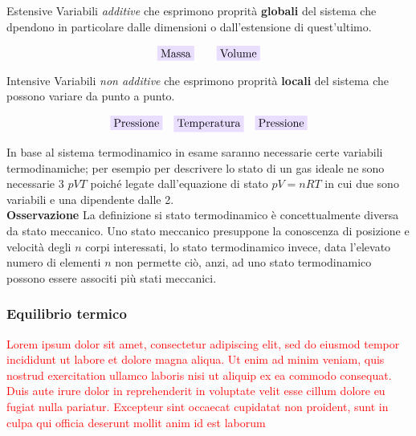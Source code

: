 \documentclass[x11names]{article}
\newcommand{\viola}[1]{\colorbox{yred}{$\displaystyle #1$}}
\begin{document}
\begin{center}
\begin{minipage}{0.49\textwidth}
	\begin{es}{Estensive}
		Variabili \textit{additive} che esprimono proprità \textbf{globali} del sistema che dpendono in particolare dalle dimensioni o dall'estensione di quest'ultimo.
		
		\[\viola{\text{Massa}} \qquad \viola{\text{Volume}}\]
		
	\end{es}
\end{minipage}
\begin{minipage}{0.49\textwidth}
	\begin{es}{Intensive}
	Variabili \textit{non additive} che esprimono proprità \textbf{locali} del sistema che possono variare da punto a punto.
	
	\[\viola{\text{Pressione}} \quad \viola{\text{Temperatura}}\quad \viola{\text{Pressione}}\]
	
	\end{es}
\end{minipage}
\end{center}
In base al sistema termodinamico in esame saranno necessarie certe variabili termodinamiche; per esempio per descrivere lo stato di un gas ideale ne sono necessarie 3 \(pVT\) poiché legate dall'equazione di stato \( pV = nRT\) in cui due sono variabili e una dipendente dalle 2.\\

\noindent
\textbf{Osservazione}  La definizione si stato termodinamico è concettualmente diversa da stato meccanico. Uno stato meccanico presuppone la conoscenza di posizione e velocità degli \(n\) corpi interessati, lo stato termodinamico invece, data l'elevato numero di elementi \(n\) non permette ciò, anzi, ad uno stato termodinamico possono essere associti più stati meccanici.

\subsubsection{Equilibrio termico}
\textcolor{red}{Lorem ipsum dolor sit amet, consectetur adipiscing elit, sed do eiusmod tempor incididunt ut labore et dolore magna aliqua. Ut enim ad minim veniam, quis nostrud exercitation ullamco laboris nisi ut aliquip ex ea commodo consequat. Duis aute irure dolor in reprehenderit in voluptate velit esse cillum dolore eu fugiat nulla pariatur. Excepteur sint occaecat cupidatat non proident, sunt in culpa qui officia deserunt mollit anim id est laborum}\\
\end{document}
